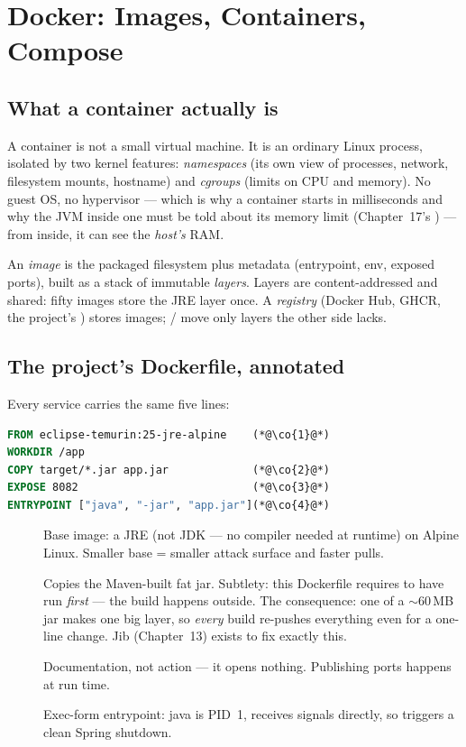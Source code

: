 \chapter{Docker: Images, Containers, Compose}
\label{ch:docker}

\section{What a container actually is}

A container is not a small virtual machine. It is an ordinary Linux
process, isolated by two kernel features: \emph{namespaces} (its own view
of processes, network, filesystem mounts, hostname) and \emph{cgroups}
(limits on CPU and memory). No guest OS, no hypervisor --- which is why a
container starts in milliseconds and why the JVM inside one must be told
about its memory limit (Chapter~17's ) --- from
inside, it can see the \emph{host's} RAM.

An \emph{image} is the packaged filesystem plus metadata (entrypoint,
env, exposed ports), built as a stack of immutable \emph{layers}. Layers
are content-addressed and shared: fifty images  store the JRE layer once. A
\emph{registry} (Docker Hub, GHCR, the project's )
stores images; / move only layers the other
side lacks.

\section{The project's Dockerfile, annotated}

Every service carries the same five lines:

\begin{lstlisting}[language=dockerfile]
FROM eclipse-temurin:25-jre-alpine    (*@\co{1}@*)
WORKDIR /app
COPY target/*.jar app.jar             (*@\co{2}@*)
EXPOSE 8082                           (*@\co{3}@*)
ENTRYPOINT ["java", "-jar", "app.jar"](*@\co{4}@*)
\end{lstlisting}

\begin{description}
  \item[] Base image: a JRE (not JDK --- no compiler needed at
  runtime) on Alpine Linux. Smaller base = smaller attack surface and
  faster pulls.
  \item[] Copies the Maven-built fat jar. Subtlety: this
  Dockerfile requires  to have run \emph{first} ---
  the build happens outside. The consequence: one  of a
  \(\sim\)60\,MB jar makes one big layer, so \emph{every} build re-pushes
  everything even for a one-line change. Jib (Chapter~13) exists to fix
  exactly this.
  \item[] Documentation, not action --- it opens nothing.
  Publishing ports happens at run time.
  \item[] Exec-form entrypoint: java is PID~1, receives signals
  directly, so  triggers a clean Spring shutdown.
\end{description}

